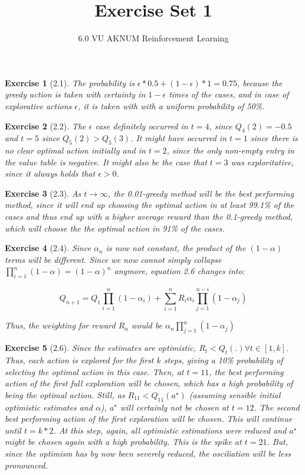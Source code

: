 \documentclass[a4paper]{scrartcl}
\title{Exercise Set 1}
\subtitle{6.0 VU AKNUM Reinforcement Learning}
\author{}
\theoremstyle{nonumberplain}
\newtheorem{ex}{Exercise}
\begin{document}
\maketitle



\begin{ex}[2.1]
The probability is $\epsilon * 0.5 + (1 - \epsilon) * 1=0.75$, because the greedy action is taken with certainty in $1 - \epsilon$ times of the cases, and in case of explorative actions $\epsilon$, it is taken with with a uniform probability of 50\%.
\end{ex}

\begin{ex}[2.2]
The $\epsilon$ case definitely occurred in $t=4$, since $Q_4(2)=-0.5$ and $t=5$ since $Q_5(2)>Q_5(3)$. It might have occurred in $t=1$ since there is no clear optimal action initially and in $t=2$, since the only non-empty entry in the value table is negative. It might also be the case that $t=3$ was exploritative, since it always holds that $\epsilon>0$.
\end{ex}

\begin{ex}[2.3]
As $t\rightarrow \infty$, the 0.01-greedy method will be the best performing method, since it will end up choosing the optimal action in at least 99.1\% of the cases and thus end up with a higher average reward than the 0.1-greedy method, which will choose the the optimal action in 91\% of the cases.
\end{ex}

\begin{ex}[2.4]
Since $\alpha_n$ is now not constant, the product of the $(1-\alpha)$ terms will be different. Since we now cannot simply collapse $\prod_{i=1}^{n}(1-\alpha)=(1-\alpha)^n$ anymore, equation 2.6 changes into:

\begin{equation}
Q_{n+1}= Q_1 \prod_{i=1}^{n}(1-\alpha_i) + \sum_{i=1}^{n} R_i \alpha_i\prod_{j=1}^{n-i} (1-\alpha_j)
\end{equation}

Thus, the weighting for reward $R_n$ would be $\alpha_n\prod_{j=1}^{n} (1-\alpha_j)$
\end{ex}

\begin{ex}[2.6]
Since the estimates are optimistic, $R_t < Q_t(.) \forall t \in [1,k]$. Thus, each action is explored for the first $k$ steps, giving a 10\% probability of selecting the optimal action in this case. Then, at $t=11$, the best performing action of the first full exploration will be chosen, which has a high probability of being the optimal action. Still, as $R_11 < Q_11(a^\star)$ (assuming sensible initial optimistic estimates and $\alpha$), $a^\star$ will certainly not be chosen at $t=12$. The second best performing action of the first exploration will be chosen. This will continue until $t=k*2$. At this step, again, all optimistic estimations were reduced and $a^\star$ might be chosen again with a high probability. This is the spike at $t=21$. But, since the optimism has by now been severely reduced, the osciliation will be less pronounced.
\end{ex}
\end{document}
